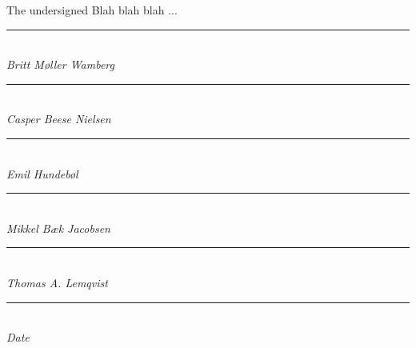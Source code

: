 {\color{red} The undersigned Blah blah blah ... }
\begin{multicols}{2}
\begin{center}
	\rule{8cm}{1pt}
\textit{\\Britt Møller Wamberg\\}
\vspace{2cm}
	\rule{8cm}{1pt}
\textit{\\Casper Beese Nielsen\\}
\columnbreak
	\rule{8cm}{1pt}
\textit{\\Emil Hundebøl\\}
\vspace{2cm}
	\rule{8cm}{1pt}
\textit{\\Mikkel Bæk Jacobsen\\}
\end{center}
\end{multicols}
\begin{center}
\vspace{2cm}
	\rule{8cm}{1pt}
\textit{\\Thomas A. Lemqvist\\}
\vspace{2cm}
\rule{8cm}{1pt}
\textit{\\Date}
\end{center}
